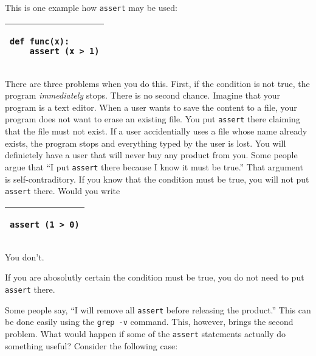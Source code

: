 This is one example how {\tt assert} may be used:

\vspace{0.2in}

\noindent
\begin{tabular}{|p{5in}|}\hline
\begin{verbatim}
def func(x):
    assert (x > 1)
\end{verbatim}
\\ \hline
\end{tabular}
\vspace{0.2in}

There are three problems when you do this.  First, if the condition is
not true, the program {\it immediately} stops.  There is no second
chance.  Imagine that your program is a text editor. When a user wants
to save the content to a file, your program does not want to erase an
existing file.  You put {\tt assert} there claiming that the file must
not exist. If a user accidentially uses a file whose name already
exists, the program stops and everything typed by the user is lost.
You will definietely have a user that will never buy any product from
you.  Some people argue that ``I put {\tt assert} there because I know
it must be true.'' That argument is self-contraditory.  If you know
that the condition must be true, you will not put {\tt assert} there.
Would you write

\vspace{0.2in}

\noindent
\begin{tabular}{|p{5in}|}\hline
\begin{verbatim}
assert (1 > 0)
\end{verbatim}
\\ \hline
\end{tabular}
\vspace{0.2in}

You don't.

If you are abosolutly certain the condition must be true, you do not
need to put {\tt assert} there.

Some people say, ``I will remove all {\tt assert} before releasing the
product.''  This can be done easily using the {\tt grep -v} command.
This, however, brings the second problem.  What would happen if
some of the {\tt assert} statements actually do something useful?
Consider the following case:



\vspace{0.2in}

